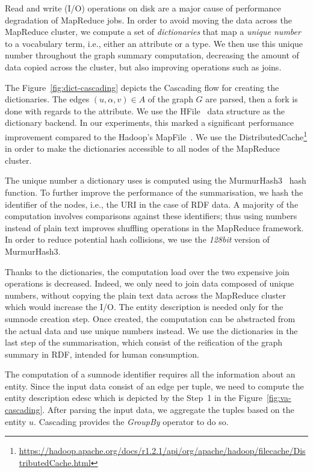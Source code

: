 
Read and write (I/O) operations on disk are a major cause of performance degradation of MapReduce jobs. In order to avoid moving the data across the MapReduce cluster, we compute a set of \emph{dictionaries} that map a \emph{unique number} to a vocabulary term, i.e., either an attribute or a type. We then use this unique number throughout the graph summary computation, decreasing the amount of data copied across the cluster, but also improving operations such as joins.

The Figure~\ref{fig:dict-cascading} depicts the Cascading flow for creating the dictionaries. The edges $(u, \alpha, v) \in A$ of the graph $G$ are parsed, then a fork is done with regards to the attribute. We use the HFile~\cite{hfile} data structure as the dictionary backend. In our experiments, this marked a significant performance improvement compared to the Hadoop's MapFile~\cite{mapfile}. We use the DistributedCache\footnote{\url{https://hadoop.apache.org/docs/r1.2.1/api/org/apache/hadoop/filecache/DistributedCache.html}} in order to make the dictionaries accessible to all nodes of the MapReduce cluster.

The unique number a dictionary uses is computed using the MurmurHash3~\cite{murmurhash3-gcode,murmurhash3-blog} hash function. To further improve the performance of the summarisation, we hash the identifier of the nodes, i.e., the URI in the case of RDF data. A majority of the computation involves comparisons against these identifiers; thus using numbers instead of plain text improves shuffling operations in the MapReduce framework. In order to reduce potential hash collisions, we use the \emph{128bit} version of MurmurHash3.

Thanks to the dictionaries, the computation load over the two expensive join operations is decreased. Indeed, we only need to join data composed of unique numbers, without copying the plain text data across the MapReduce cluster which would increase the I/O. The entity description is needed only for the sumnode creation step. Once created, the computation can be abstracted from the actual data and use unique numbers instead. We use the dictionaries in the last step of the summarisation, which consist of the reification of the graph summary in RDF, intended for human consumption.


The computation of a sumnode identifier requires all the information about an entity. Since the input data consist of an edge per tuple, we need to compute the entity description \gls{edesc} which is depicted by the Step~1 in the Figure~\ref{fig:va-cascading}. After parsing the input data, we aggregate the tuples based on the entity $u$. Cascading provides the \emph{GroupBy} operator to do so.

